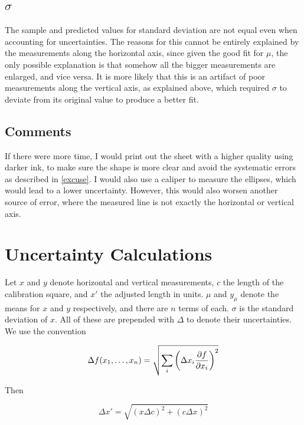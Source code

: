 \documentclass[12pt]{article}
\begin{document}
\subsection{$\sigma$}

The sample and predicted values for standard deviation are not equal even when accounting for uncertainties. The reasons for this cannot be entirely explained by the measurements along the horizontal axis, since given the good fit for $\mu$, the only possible explanation is that somehow all the bigger measurements are enlarged, and vice versa. It is more likely that this is an artifact of poor measurements along the vertical axis, as explained above, which required $\sigma$ to deviate from its original value to produce a better fit.

\subsection{Comments}

If there were more time, I would print out the sheet with a higher quality using darker ink, to make sure the shape is more clear and avoid the systematic errors as described in \ref{excuse}. I would also use a caliper to measure the ellipses, which would lead to a lower uncertainty. However, this would also worsen another source of error, where the measured line is not exactly the horizontal or vertical axis.

\appendix


\section{Uncertainty Calculations} \label{math}

Let $x$ and $y$ denote horizontal and vertical measurements, $c$ the length of the calibration square, and $x'$ the adjusted length in units. $\mu$ and $y_\mu$ denote the means for $x$ and $y$ respectively, and there are $n$ terms of each. $\sigma$ is the standard deviation of $x$. All of these are prepended with $\Delta$ to denote their uncertainties. We use the convention

\begin{equation}
    \Delta f(x_1,\dots,x_n) = \sqrt{\sum_i \left(\Delta x_i \frac{\partial f}{\partial x_i}\right)^2}
\end{equation}

Then

\begin{equation}
    \Delta x' = \sqrt{(x\Delta c)^2 + (c\Delta x)^2}
\end{equation}
\end{document}
